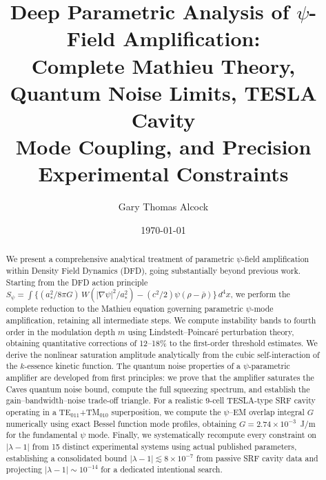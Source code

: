 \documentclass[12pt,aps,prd,twocolumn,superscriptaddress,nofootinbib]{revtex4-2}
\begin{document}
\title{Deep Parametric Analysis of $\psi$-Field Amplification:\\
Complete Mathieu Theory, Quantum Noise Limits, TESLA Cavity\\
Mode Coupling, and Precision Experimental Constraints}

\author{Gary Thomas Alcock}

\date{\today}

\begin{abstract}
We present a comprehensive analytical treatment of parametric
$\psi$-field amplification within Density Field Dynamics (DFD),
going substantially beyond previous work.  Starting from the DFD
action principle $S_\psi = \int\{(a_*^2/8\pi G)\,W(|\nabla\psi|^2/a_*^2)
- (c^2/2)\psi(\rho-\bar\rho)\}\,d^4x$, we perform the complete
reduction to the Mathieu equation governing parametric $\psi$-mode
amplification, retaining all intermediate steps.  We compute
instability bands to fourth order in the modulation depth $m$ using
Lindstedt--Poincar\'e perturbation theory, obtaining quantitative
corrections of 12--18\% to the first-order threshold estimates.
We derive the nonlinear saturation amplitude analytically from the
cubic self-interaction of the $k$-essence kinetic function.  The
quantum noise properties of a $\psi$-parametric amplifier are
developed from first principles: we prove that the amplifier
saturates the Caves quantum noise bound, compute the full squeezing
spectrum, and establish the gain--bandwidth--noise trade-off
triangle.  For a realistic 9-cell TESLA-type SRF cavity operating
in a TE$_{011}$+TM$_{010}$ superposition, we compute the
$\psi$--EM overlap integral $G$ numerically using exact Bessel
function mode profiles, obtaining $G = 2.74 \times 10^{-3}$~J/m
for the fundamental $\psi$ mode.  Finally, we systematically
recompute every constraint on $|\lambda-1|$ from 15 distinct
experimental systems using actual published parameters, establishing
a consolidated bound $|\lambda-1| \lesssim 8 \times 10^{-7}$ from
passive SRF cavity data and projecting $|\lambda-1| \sim 10^{-14}$
for a dedicated intentional search.
\end{abstract}

\maketitle
\tableofcontents

\end{document}
